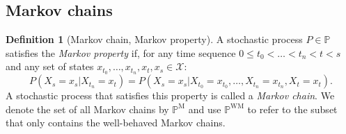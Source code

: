 \documentclass[10pt]{paper}
\theoremstyle{definition}
\newtheorem{corollary}[theorem]{Corollary}
\newtheorem{definition}{Definition}
\newcommand{\reals}{\mathbb{R}}
\newcommand{\realspos}{\reals_{>0}}
\newcommand{\realsnonneg}{\reals_{\geq 0}}
\newcommand{\states}{\mathcal{X}}
\newcommand{\processes}{\mathbb{P}}
\newcommand{\mprocesses}{\processes^{\mathrm{M}}}
\newcommand{\wmprocesses}{\processes^{\mathrm{WM}}}
\newcommand{\norm}[1]{\left\lVert #1 \right\rVert}
\begin{document}
%

\subsection{Markov chains}

\begin{definition}[Markov chain, Markov property]\label{def:markov_property}
A stochastic process $P\in\processes$ satisfies the \emph{Markov property} if, for any time sequence $0\leq t_0<\dots<t_{n}<t<s$ and any set of states $x_{t_0},\dots,x_{t_n},x_t,x_s\in\states$:
\begin{equation*}
P(X_s=x_s\vert X_{t_n}=x_{t})=P(X_s=x_s\vert X_{t_0}=x_{t_0}, \dots, X_{t_n}=x_{t_n}, X_t=x_t).
\end{equation*}
A stochastic process that satisfies this property is called a \emph{Markov chain}. We denote the set of all Markov chains by $\mprocesses$ and use $\wmprocesses$ to refer to the subset that only contains the well-behaved Markov chains.
\end{definition}
\end{document}
